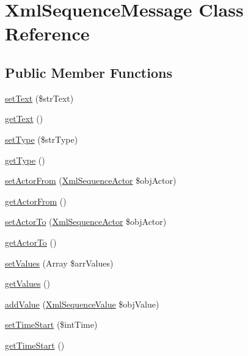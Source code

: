 \hypertarget{class_xml_sequence_message}{
\section{XmlSequenceMessage Class Reference}
\label{class_xml_sequence_message}
}
\subsection*{Public Member Functions}
\begin{CompactItemize}
\item 
\hyperlink{class_xml_sequence_message_a4d5880601982b4e882e52f657480cc5}{setText} (\$strText)
\item 
\hyperlink{class_xml_sequence_message_1f80c7d126fc2183c3c99a71df3f1d20}{getText} ()
\item 
\hyperlink{class_xml_sequence_message_a6a08c247856f2721b867676aa130214}{setType} (\$strType)
\item 
\hyperlink{class_xml_sequence_message_d839c7bfe476a42ddf264d019a13938b}{getType} ()
\item 
\hyperlink{class_xml_sequence_message_8dd8205552a1f91a32541187ff799d2f}{setActorFrom} (\hyperlink{class_xml_sequence_actor}{XmlSequenceActor} \$objActor)
\item 
\hyperlink{class_xml_sequence_message_d174306473bc3ba17083bd0c2c100443}{getActorFrom} ()
\item 
\hyperlink{class_xml_sequence_message_dd5dde3ef38d814ef76f6855b38cebc8}{setActorTo} (\hyperlink{class_xml_sequence_actor}{XmlSequenceActor} \$objActor)
\item 
\hyperlink{class_xml_sequence_message_d67a02882cb2602e3171f012650160f6}{getActorTo} ()
\item 
\hyperlink{class_xml_sequence_message_4ed3a9eceec6ce84566098813fde6101}{setValues} (Array \$arrValues)
\item 
\hyperlink{class_xml_sequence_message_9c2e8f8d995477aad79640ad673ab6a9}{getValues} ()
\item 
\hyperlink{class_xml_sequence_message_fc28193031e8ccdedf401767f7881267}{addValue} (\hyperlink{class_xml_sequence_value}{XmlSequenceValue} \$objValue)
\item 
\hyperlink{class_xml_sequence_message_4125b914cfa073d64b144b5607efdb3d}{setTimeStart} (\$intTime)
\item 
\hyperlink{class_xml_sequence_message_27b24a732d56e0b1cf7fd755d2c52983}{getTimeStart} ()
\item 

\end{CompactItemize}
